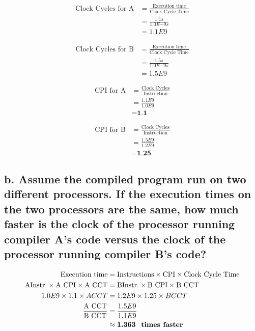 \documentclass[12pt]{article}
\begin{document}
\begin{align*}
\textrm{Clock Cycles for A} & = \frac{\textrm{Execution time}}{\textrm{Clock Cycle Time}} \\
& = \frac{1.1s}{1.0E{-9}s}\\
& = 1.1E9
\end{align*}

\begin{align*}
\textrm{Clock Cycles for B} & = \frac{\textrm{Execution time}}{\textrm{Clock Cycle Time}} \\
& = \frac{1.5s}{1.0E{-9}s}\\
& = 1.5E9
\end{align*}

\begin{align*}
\textrm{CPI for A} & = \frac{\textrm{Clock Cycles}}{\textrm{Instruction}} \\
& = \frac{1.1E9}{1.0E9}\\
& = \textbf{1.1}
\end{align*}

\begin{align*}
\textrm{CPI for B} & = \frac{\textrm{Clock Cycles}}{\textrm{Instruction}} \\
& = \frac{1.5E9}{1.2E9}\\
& = \textbf{1.25}
\end{align*}

\subsection*{\small b. Assume the compiled program run on two different processors. If the execution times on the two processors are the same, how much faster is the clock of the processor running compiler A's code versus the clock of the processor running compiler B's code?}

\begin{align*}
\textrm{Execution time} & = \textrm{Instructions} \times \textrm{CPI} \times \textmd{Clock Cycle Time}\\
\textrm{AInstr.} \times \textrm{A CPI} \times \textmd{A CCT} & =  \textrm{BInstr.} \times \textrm{B CPI} \times \textmd{B CCT}\\
1.0E9 \times 1.1 \times A CCT & = 1.2E9 \times 1.25 \times B CCT\\
\frac{\textrm{A CCT}}{\textrm{B CCT}} & = \frac{1.5E9}{1.1E9}\\
& \approx \textbf{1.363 \textrm{ times faster}}
\end{align*}
\end{document}

